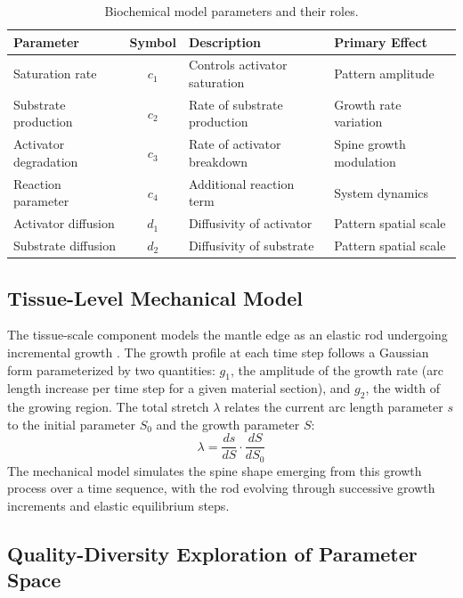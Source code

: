 \documentclass[11pt]{article}
\begin{document}
\begin{table}[htbp]
\centering
\caption{Biochemical model parameters and their roles.}
\label{tab:params}
\begin{tabular}{lcll}
\toprule
\textbf{Parameter} & \textbf{Symbol} & \textbf{Description} & \textbf{Primary Effect} \\
\midrule
Saturation rate & $c_1$ & Controls activator saturation & Pattern amplitude \\
Substrate production & $c_2$ & Rate of substrate production & Growth rate variation \\
Activator degradation & $c_3$ & Rate of activator breakdown & Spine growth modulation \\
Reaction parameter & $c_4$ & Additional reaction term & System dynamics \\
Activator diffusion & $d_1$ & Diffusivity of activator & Pattern spatial scale \\
Substrate diffusion & $d_2$ & Diffusivity of substrate & Pattern spatial scale \\
\bottomrule
\end{tabular}
\end{table}

\subsection{Tissue-Level Mechanical Model}

The tissue-scale component models the mantle edge as an elastic rod undergoing incremental growth \citep{chirat2013,goriely2017,moulin2019}. The growth profile at each time step follows a Gaussian form parameterized by two quantities: $g_1$, the amplitude of the growth rate (arc length increase per time step for a given material section), and $g_2$, the width of the growing region. The total stretch $\lambda$ relates the current arc length parameter $s$ to the initial parameter $S_0$ and the growth parameter $S$:
\begin{equation}
\lambda = \frac{ds}{dS} \cdot \frac{dS}{dS_0}
\end{equation}
The mechanical model simulates the spine shape emerging from this growth process over a time sequence, with the rod evolving through successive growth increments and elastic equilibrium steps.

\subsection{Quality-Diversity Exploration of Parameter Space}
\end{document}
